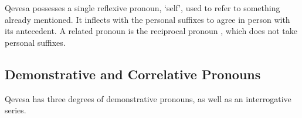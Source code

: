 \documentclass[grammar]{subfiles}
\begin{document}
   Qevesa possesses a single reflexive pronoun,  ‘self’, used to
   refer to something already mentioned.  It inflects with the personal
   suffixes to agree in person with its antecedent.  A related pronoun is the
   reciprocal pronoun , which does not take personal suffixes.



  \subsection{Demonstrative and Correlative Pronouns}
  \label{ssec:nm_demonstrative_pronouns}

  Qevesa has three degrees of demonstrative pronouns, as well as an interrogative series.
\end{document}
